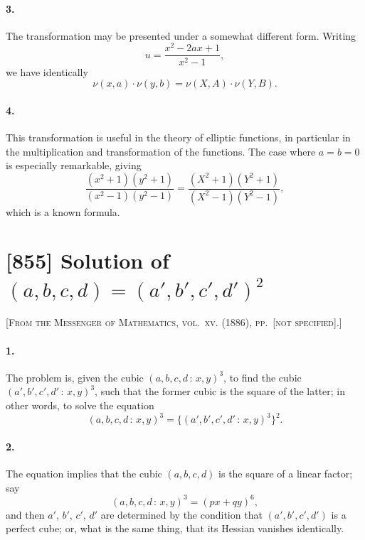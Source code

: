 \documentclass[11pt,a4paper]{book}
\begin{document}
\paragraph{3.} The transformation may be presented under a somewhat different form. Writing
\[
u = \frac{x^{2} - 2ax + 1}{x^{2} - 1},
\]
we have identically
\[
\nu(x, a) \cdot \nu(y, b) = \nu(X, A) \cdot \nu(Y, B).
\]

\paragraph{4.} This transformation is useful in the theory of elliptic functions, in particular in the multiplication and transformation of the functions. The case where $a = b = 0$ is especially remarkable, giving
\[
\frac{(x^{2}+1)(y^{2}+1)}{(x^{2}-1)(y^{2}-1)} = \frac{(X^{2}+1)(Y^{2}+1)}{(X^{2}-1)(Y^{2}-1)},
\]
which is a known formula.

\newpage
\section*{[855] Solution of $(a, b, c, d) = (a', b', c', d')^{2}$}

\noindent\textsc{[From the Messenger of Mathematics, vol.~xv. (1886), pp.~[not specified].]}

\smallskip

\paragraph{1.} The problem is, given the cubic $(a, b, c, d\,\colon\,x, y)^{3}$, to find the cubic $(a', b', c', d'\,\colon\,x, y)^{3}$, such that the former cubic is the square of the latter; in other words, to solve the equation
\[
(a, b, c, d\,\colon\,x, y)^{3} = \{(a', b', c', d'\,\colon\,x, y)^{3}\}^{2}.
\]

\paragraph{2.} The equation implies that the cubic $(a, b, c, d)$ is the square of a linear factor; say
\[
(a, b, c, d\,\colon\,x, y)^{3} = (px + qy)^{6},
\]
and then $a'$, $b'$, $c'$, $d'$ are determined by the condition that $(a', b', c', d')$ is a perfect cube; or, what is the same thing, that its Hessian vanishes identically.
\end{document}
